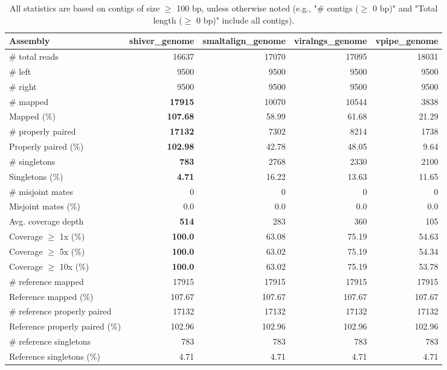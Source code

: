 \documentclass[12pt,a4paper]{article}
\begin{document}
\begin{table}[ht]
\begin{center}
\caption{All statistics are based on contigs of size $\geq$ 100 bp, unless otherwise noted (e.g., "\# contigs ($\geq$ 0 bp)" and "Total length ($\geq$ 0 bp)" include all contigs).}
\begin{tabular}{|l*{4}{|r}|}
\hline
Assembly & shiver\_genome & smaltalign\_genome & viralngs\_genome & vpipe\_genome \\ \hline
\# total reads & 16637 & 17070 & 17095 & 18031 \\ \hline
\# left & 9500 & 9500 & 9500 & 9500 \\ \hline
\# right & 9500 & 9500 & 9500 & 9500 \\ \hline
\# mapped & {\bf 17915} & 10070 & 10544 & 3838 \\ \hline
Mapped (\%) & {\bf 107.68} & 58.99 & 61.68 & 21.29 \\ \hline
\# properly paired & {\bf 17132} & 7302 & 8214 & 1738 \\ \hline
Properly paired (\%) & {\bf 102.98} & 42.78 & 48.05 & 9.64 \\ \hline
\# singletons & {\bf 783} & 2768 & 2330 & 2100 \\ \hline
Singletons (\%) & {\bf 4.71} & 16.22 & 13.63 & 11.65 \\ \hline
\# misjoint mates & 0 & 0 & 0 & 0 \\ \hline
Misjoint mates (\%) & 0.0 & 0.0 & 0.0 & 0.0 \\ \hline
Avg. coverage depth & {\bf 514} & 283 & 360 & 105 \\ \hline
Coverage $\geq$ 1x (\%) & {\bf 100.0} & 63.08 & 75.19 & 54.63 \\ \hline
Coverage $\geq$ 5x (\%) & {\bf 100.0} & 63.02 & 75.19 & 54.34 \\ \hline
Coverage $\geq$ 10x (\%) & {\bf 100.0} & 63.02 & 75.19 & 53.78 \\ \hline
\# reference mapped & 17915 & 17915 & 17915 & 17915 \\ \hline
Reference mapped (\%) & 107.67 & 107.67 & 107.67 & 107.67 \\ \hline
\# reference properly paired & 17132 & 17132 & 17132 & 17132 \\ \hline
Reference properly paired (\%) & 102.96 & 102.96 & 102.96 & 102.96 \\ \hline
\# reference singletons & 783 & 783 & 783 & 783 \\ \hline
Reference singletons (\%) & 4.71 & 4.71 & 4.71 & 4.71 \\ \hline

\end{tabular}
\end{center}
\end{table}
\end{document}
